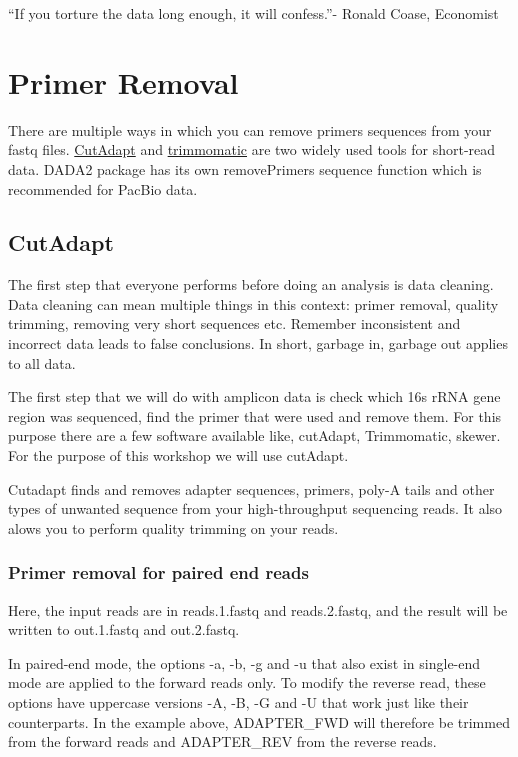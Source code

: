 \documentclass[
]{book}
\begin{document}
``If you torture the data long enough, it will confess.''- Ronald Coase, Economist

\hypertarget{primer-removal}{%
\chapter{Primer Removal}\label{primer-removal}}

There are multiple ways in which you can remove primers sequences from your fastq files.
\href{https://cutadapt.readthedocs.io/en/stable/index.html}{CutAdapt} and \href{http://www.usadellab.org/cms/?page=trimmomatic}{trimmomatic} are two widely used tools for short-read data. DADA2 package has its own removePrimers sequence function which is recommended for PacBio data.

\hypertarget{cutadapt}{%
\section{CutAdapt}\label{cutadapt}}

The first step that everyone performs before doing an analysis is data cleaning. Data cleaning can mean multiple things in this context: primer removal, quality trimming, removing very short sequences etc. Remember inconsistent and incorrect data leads to false conclusions. In short, garbage in, garbage out applies to all data.

The first step that we will do with amplicon data is check which 16s rRNA gene region was sequenced, find the primer that were used and remove them. For this purpose there are a few software available like, cutAdapt, Trimmomatic, skewer. For the purpose of this workshop we will use cutAdapt.

Cutadapt finds and removes adapter sequences, primers, poly-A tails and other types of unwanted sequence from your high-throughput sequencing reads. It also alows you to perform quality trimming on your reads.

\hypertarget{primer-removal-for-paired-end-reads}{%
\subsection{Primer removal for paired end reads}\label{primer-removal-for-paired-end-reads}}

Here, the input reads are in reads.1.fastq and reads.2.fastq, and the result will be written to out.1.fastq and out.2.fastq.

In paired-end mode, the options -a, -b, -g and -u that also exist in single-end mode are applied to the forward reads only. To modify the reverse read, these options have uppercase versions -A, -B, -G and -U that work just like their counterparts. In the example above, ADAPTER\_FWD will therefore be trimmed from the forward reads and ADAPTER\_REV from the reverse reads.
\end{document}
